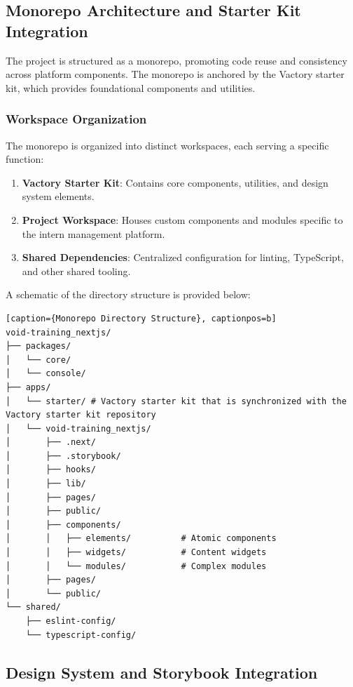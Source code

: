 \subsection{Monorepo Architecture and Starter Kit Integration}
\noindent
The project is structured as a monorepo, promoting code reuse and consistency across platform components. The monorepo is anchored by the Vactory starter kit, which provides foundational components and utilities.

\subsubsection{Workspace Organization}
\noindent
The monorepo is organized into distinct workspaces, each serving a specific function:

\begin{enumerate}
    \item \textbf{Vactory Starter Kit}: Contains core components, utilities, and design system elements.
    \item \textbf{Project Workspace}: Houses custom components and modules specific to the intern management platform.
    \item \textbf{Shared Dependencies}: Centralized configuration for linting, TypeScript, and other shared tooling.
\end{enumerate}

A schematic of the directory structure is provided below:

\begin{verbatim}[caption={Monorepo Directory Structure}, captionpos=b]
void-training_nextjs/
├── packages/
│   └── core/
│   └── console/
├── apps/
│   └── starter/ # Vactory starter kit that is synchronized with the Vactory starter kit repository
│   └── void-training_nextjs/
│       ├── .next/
│       ├── .storybook/
│       ├── hooks/
│       ├── lib/
│       ├── pages/
│       ├── public/
│       ├── components/
│       │   ├── elements/          # Atomic components
│       │   ├── widgets/           # Content widgets
│       │   └── modules/           # Complex modules
│       ├── pages/
│       └── public/
└── shared/
    ├── eslint-config/
    └── typescript-config/
\end{verbatim}

\subsection{Design System and Storybook Integration}


